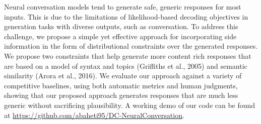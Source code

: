 Neural conversation models tend to generate safe, generic responses for most inputs.  This is due to the limitations of likelihood-based decoding objectives in generation tasks with diverse outputs, such as conversation. To address this challenge, we propose a simple yet effective approach for incorporating side information in the form of distributional constraints over the generated responses.  We propose two constraints that help generate more content rich responses that are based on a model of syntax and topics (Griffiths  et  al.,  2005) and semantic similarity (Arora et al., 2016). We evaluate our approach against a variety of competitive baselines, using both automatic metrics and human judgments, showing that our proposed approach generates responses that are much less generic without sacrificing plausibility. A working demo of our code can be found at \url{https://github.com/abaheti95/DC-NeuralConversation}.
